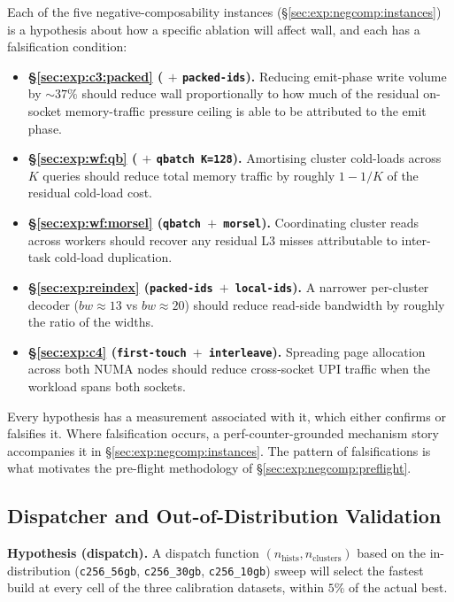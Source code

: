 Each of the five negative-composability instances (§\ref{sec:exp:negcomp:instances}) is a hypothesis about how a specific ablation will affect wall, and each has a falsification condition:

\begin{itemize}
    \item \textbf{§\ref{sec:exp:c3:packed} (\bcombo{} $+$ \texttt{packed-ids}).} Reducing emit-phase write volume by $\sim\!37\%$ should reduce wall proportionally to how much of the residual on-socket memory-traffic pressure ceiling is able to be attributed to the emit phase.
    \item \textbf{§\ref{sec:exp:wf:qb} (\bcombo{} $+$ \texttt{qbatch K=128}).} Amortising cluster cold-loads across $K$ queries should reduce total memory traffic by roughly $1{-}1/K$ of the residual cold-load cost.
    \item \textbf{§\ref{sec:exp:wf:morsel} (\texttt{qbatch $+$ morsel}).} Coordinating cluster reads across workers should recover any residual L3 misses attributable to inter-task cold-load duplication.
    \item \textbf{§\ref{sec:exp:reindex} (\texttt{packed-ids $+$ local-ids}).} A narrower per-cluster decoder ($bw{\approx}13$ vs $bw{\approx}20$) should reduce read-side bandwidth by roughly the ratio of the widths.
    \item \textbf{§\ref{sec:exp:c4} (\texttt{first-touch $+$ interleave}).} Spreading page allocation across both NUMA nodes should reduce cross-socket UPI traffic when the workload spans both sockets.
\end{itemize}

Every hypothesis has a measurement associated with it, which either confirms or falsifies it. Where falsification occurs, a perf-counter-grounded mechanism story accompanies it in §\ref{sec:exp:negcomp:instances}. The pattern of falsifications is what motivates the pre-flight methodology of §\ref{sec:exp:negcomp:preflight}.

\subsection{Dispatcher and Out-of-Distribution Validation}

\textbf{Hypothesis (dispatch).} A dispatch function $(n_{\text{hists}}, n_{\text{clusters}})$ based on the in-distribution (\texttt{c256\_56gb}, \texttt{c256\_30gb}, \texttt{c256\_10gb}) sweep will select the fastest build at every cell of the three calibration datasets, within $5\%$ of the actual best. 


